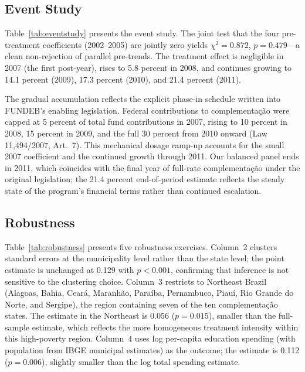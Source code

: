 \documentclass[12pt]{article}
\begin{document}


\subsection{Event Study}

Table~\ref{tab:eventstudy} presents the event study. The joint test that the four
pre-treatment coefficients (2002--2005) are jointly zero yields $\chi^2 = 0.872$,
$p = 0.479$---a clean non-rejection of parallel pre-trends. The treatment effect is
negligible in 2007 (the first post-year), rises to 5.8 percent in 2008, and continues
growing to 14.1 percent (2009), 17.3 percent (2010), and 21.4 percent (2011).

The gradual accumulation reflects the explicit phase-in schedule written into
FUNDEB's enabling legislation. Federal contributions to complementa\c{c}\~ao were
capped at 5 percent of total fund contributions in 2007, rising to 10 percent in
2008, 15 percent in 2009, and the full 30 percent from 2010 onward (Law 11,494/2007, Art.\ 7).
This mechanical dosage ramp-up accounts for the small 2007 coefficient and the
continued growth through 2011. Our balanced panel ends in 2011, which coincides
with the final year of full-rate complementa\c{c}\~ao under the original legislation;
the 21.4 percent end-of-period estimate reflects the steady state of the program's
financial terms rather than continued escalation.



\subsection{Robustness}

Table~\ref{tab:robustness} presents five robustness exercises. Column~2 clusters
standard errors at the municipality level rather than the state level; the point
estimate is unchanged at 0.129 with $p < 0.001$, confirming that inference is not
sensitive to the clustering choice. Column~3 restricts to Northeast Brazil (Alagoas,
Bahia, Cear\'a, Maranh\~ao, Para\'iba, Pernambuco, Piau\'i, Rio Grande do Norte,
and Sergipe), the region containing seven of the ten complementa\c{c}\~ao states.
The estimate in the Northeast is 0.056 ($p = 0.015$), smaller than the full-sample
estimate, which reflects the more homogeneous treatment intensity within this high-poverty
region. Column~4 uses log per-capita education spending (with population from IBGE
municipal estimates) as the outcome; the estimate is 0.112 ($p = 0.006$), slightly
smaller than the log total spending estimate.
\end{document}
